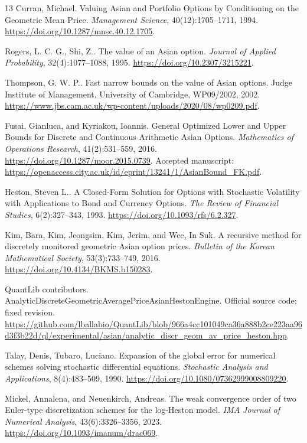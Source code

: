 \begin{thebibliography}{13}
Curran, Michael.
Valuing {Asian} and Portfolio Options by Conditioning on the Geometric Mean Price.
\emph{Management Science}, 40(12):1705--1711, 1994.
\url{https://doi.org/10.1287/mnsc.40.12.1705}.

Rogers, L. C. G., Shi, Z..
The value of an {Asian} option.
\emph{Journal of Applied Probability}, 32(4):1077--1088, 1995.
\url{https://doi.org/10.2307/3215221}.

Thompson, G. W. P..
Fast narrow bounds on the value of {Asian} options.
Judge Institute of Management, University of Cambridge, WP09/2002, 2002.
\url{https://www.jbs.cam.ac.uk/wp-content/uploads/2020/08/wp0209.pdf}.

Fusai, Gianluca, and Kyriakou, Ioannis.
General Optimized Lower and Upper Bounds for Discrete and Continuous Arithmetic {Asian} Options.
\emph{Mathematics of Operations Research}, 41(2):531--559, 2016.
\url{https://doi.org/10.1287/moor.2015.0739}.
Accepted manuscript: \url{https://openaccess.city.ac.uk/id/eprint/13241/1/AsianBound_FK.pdf}.

Heston, Steven L..
A Closed-Form Solution for Options with Stochastic Volatility with Applications to Bond and Currency Options.
\emph{The Review of Financial Studies}, 6(2):327--343, 1993.
\url{https://doi.org/10.1093/rfs/6.2.327}.

Kim, Bara, Kim, Jeongsim, Kim, Jerim, and Wee, In Suk.
A recursive method for discretely monitored geometric {Asian} option prices.
\emph{Bulletin of the Korean Mathematical Society}, 53(3):733--749, 2016.
\url{https://doi.org/10.4134/BKMS.b150283}.

{QuantLib contributors}.
{AnalyticDiscreteGeometricAveragePriceAsianHestonEngine}.
Official source code; fixed revision.
\url{https://github.com/lballabio/QuantLib/blob/966a4cc101049ca36a888b2ce223aa96d3f3b22d/ql/experimental/asian/analytic_discr_geom_av_price_heston.hpp}.

Talay, Denis, Tubaro, Luciano.
Expansion of the global error for numerical schemes solving stochastic differential equations.
\emph{Stochastic Analysis and Applications}, 8(4):483--509, 1990.
\url{https://doi.org/10.1080/07362999008809220}.

Mickel, Annalena, and Neuenkirch, Andreas.
The weak convergence order of two {Euler}-type discretization schemes for the log-{Heston} model.
\emph{IMA Journal of Numerical Analysis}, 43(6):3326--3356, 2023.
\url{https://doi.org/10.1093/imanum/drac069}.


\end{thebibliography}
